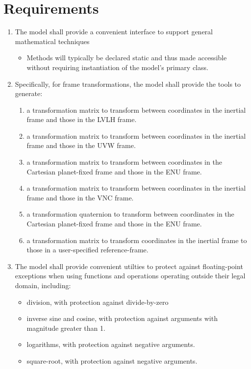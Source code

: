 \documentclass[11pt,fleqn]{report}
\begin{document}
\chapter{Requirements}
\begin{enumerate}
\item The model shall provide a convenient interface to support general
mathematical techniques
\begin {itemize}
\item Methods will typically be declared static and thus made
accessible without requiring instantiation of the model's
primary class.
\end {itemize}

\item Specifically, for frame transformations, the model shall provide the
tools to generate:
\begin{enumerate}
\item a transformation matrix to transform between coordinates in the
inertial frame and those in the LVLH frame.
\item a transformation matrix to transform between coordinates in the
inertial frame and those in the UVW frame.
\item a transformation matrix to transform between coordinates in the
Cartesian planet-fixed frame and those in the ENU frame.
\item a transformation matrix to transform between coordinates in the
inertial frame and those in the VNC frame.
\item a transformation quaternion to transform between coordinates
in the Cartesian planet-fixed frame and those in the ENU frame.
\item a transformation matrix to transform coordinates in the
inertial frame to those in a user-specified reference-frame.
\end{enumerate}
\item The model shall provide convenient utilties to protect against
floating-point exceptions when using functions and operations
operating outside their legal domain, including:
\begin{itemize}
\item division, with protection against divide-by-zero
\item inverse sine and cosine, with protection against arguments
with magnitude greater than 1.
\item logarithms, with protection against negative arguments.
\item square-root, with protection against negative arguments.

\end{itemize}
\end{enumerate}
\end{document}
